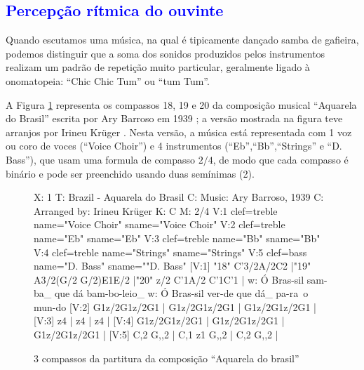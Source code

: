 \subsection{\textcolor{blue}{Percepção rítmica do ouvinte}}
\label{subsec:percepcaoouvinte}
Quando escutamos uma música, na qual é tipicamente dançado samba de gafieira,
podemos distinguir que a soma dos sonidos produzidos pelos instrumentos realizam 
um padrão de repetição muito particular, geralmente ligado à onomatopeia: ``Chic Chic Tum'' ou ``tum Tum''.


A Figura \ref{fig:abc-caquarela} representa os compassos 18, 19 e 20 da  
composição musical ``Aquarela do Brasil'' escrita
por Ary Barroso em 1939 \cite{AquarelaDoBrasil}; 
a versão mostrada na figura teve arranjos por Irineu Krüger \cite{Irineu}. 
Nesta versão, a música está representada com 1 voz ou coro de voces (``Voice Choir'') e 4 
instrumentos (``Eb'',``Bb'',``Strings'' e ``D. Bass''), que usam uma 
formula de compasso $2/4$, de modo que cada compasso
é binário e
pode ser preenchido usando duas semínimas (2\quarternote).
\begin{figure}[ht]
\centering
\begin{abc}[name=abc-caquarela]
%
X: 1 %
T: Brazil - Aquarela do Brasil
C: Music: Ary Barroso, 1939
C: Arranged by: Irineu Krüger
K: C %
M: 2/4 %
%
V:1 clef=treble name="Voice Choir" sname="Voice Choir"
V:2 clef=treble name="Eb" sname="Eb"
V:3 clef=treble name="Bb" sname="Bb"
V:4 clef=treble name="Strings" sname="Strings"
V:5 clef=bass   name="D. Bass" sname=""D. Bass"
%
%
[V:1] "18" C'3/2A/2C2  |"19" A3/2(G/2 G/2)E1E/2  |"20" z/2 C'1A/2 C'1C'1  |
w:    Ó Bras-sil        sam-ba_ que dá       bam-bo-leio_ 
w:    Ó Bras-sil        ver-de que dá_       pa-ra~o mun-do 
%
%
[V:2] G1z/2G1z/2G1  | G1z/2G1z/2G1  | G1z/2G1z/2G1  |
%
%
[V:3] z4  | z4  | z4  |
%
%
[V:4] G1z/2G1z/2G1  | G1z/2G1z/2G1  | G1z/2G1z/2G1  |
%
%
[V:5] C,2 G,,2  | C,1 z1 G,,2  | C,2 G,,2  |
\end{abc}
\caption{3 compassos da partitura da composição ``Aquarela do brasil''}
\label{fig:abc-caquarela}
\end{figure}

